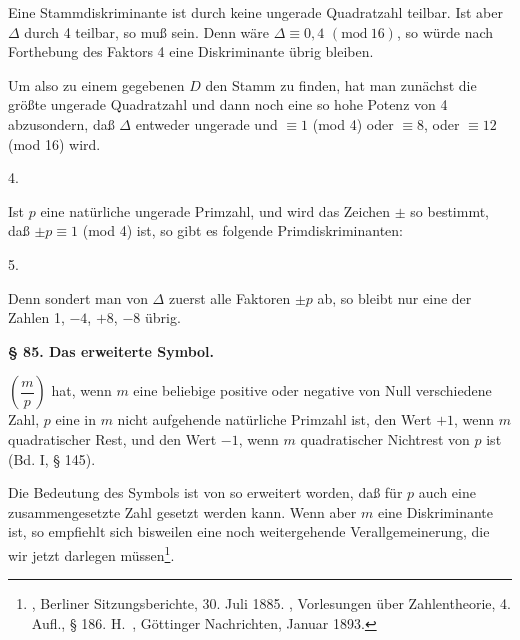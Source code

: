 
Eine Stammdiskriminante ist durch keine ungerade Quadratzahl teilbar. Ist aber $\Delta$ durch 4 teilbar, so muß
sein. Denn wäre $\Delta \equiv 0, 4$ $(\mathrm{mod}\ 16)$, so würde nach Forthebung des Faktors 4 eine Diskriminante übrig bleiben.

Um also zu einem gegebenen $D$ den Stamm zu finden, hat man zunächst die größte ungerade Quadratzahl und dann noch eine so hohe Potenz von 4 abzusondern, daß $\Delta$ entweder ungerade und $\equiv 1$ (mod 4) oder $\equiv 8$, oder $\equiv 12$ (mod 16) wird.

4. 

Ist $p$ eine natürliche ungerade Primzahl, und wird das Zeichen $\pm$ so bestimmt, daß $\pm p \equiv 1$ (mod 4) ist, so gibt es folgende Primdiskriminanten:

5. 

Denn sondert man von $\Delta$ zuerst alle Faktoren $\pm p$ ab, so bleibt nur eine der Zahlen 1, $-4$, $+8$, $-8$ übrig.

\begin{center}
\textbf{§ 85. Das erweiterte  Symbol.}
\end{center}

 $\left(\dfrac{m}{p}\right)$ hat, wenn $m$ eine beliebige positive oder negative von Null verschiedene Zahl, $p$ eine in $m$ nicht aufgehende natürliche Primzahl ist, den Wert $+1$, wenn $m$ quadratischer Rest, und den Wert $-1$, wenn $m$ quadratischer Nichtrest von $p$ ist (Bd. I, § 145).

Die Bedeutung des Symbols ist von  so erweitert worden, daß für $p$ auch eine zusammengesetzte Zahl gesetzt werden kann. Wenn aber $m$ eine Diskriminante ist, so empfiehlt sich bisweilen eine noch weitergehende Verallgemeinerung, die wir jetzt darlegen müssen\footnote{, Berliner Sitzungsberichte, 30. Juli 1885. , Vorlesungen über Zahlentheorie, 4. Aufl., § 186. H.\ , Göttinger Nachrichten, Januar 1893.}.
